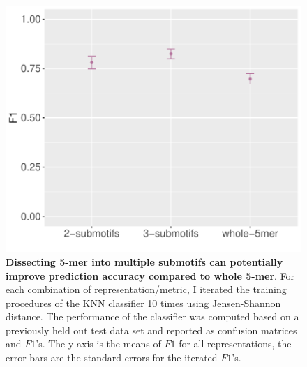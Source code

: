 \begin{figure}[h!]
    \centering
    \includegraphics[scale=0.8]{graphics/f1_sce_submotif.pdf}
    \caption{\textbf{Dissecting 5-mer into multiple submotifs can potentially improve prediction accuracy compared to whole 5-mer}. For each combination of representation/metric, I iterated the training procedures of the KNN classifier 10 times using Jensen-Shannon distance. The performance of the classifier was computed based on a previously held out test data set and reported as confusion matrices and $F1$'s. The y-axis is the means of $F1$ for all representations, the error bars are the standard errors for the iterated $F1$’s.}
    \label{fig:f1_sce_submotif}
\end{figure}
